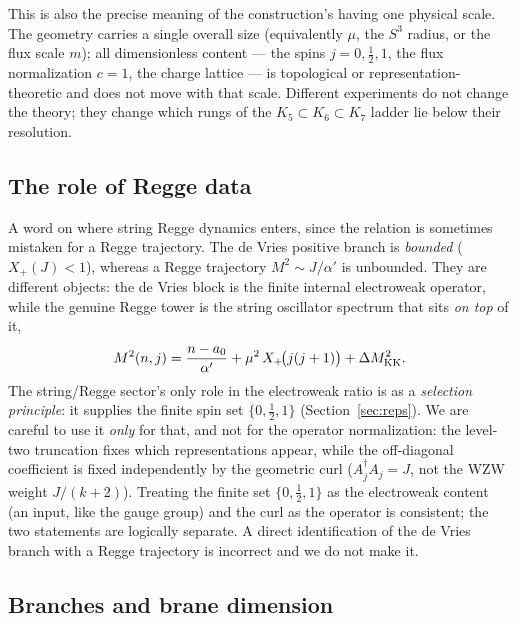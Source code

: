 \documentclass[11pt]{article}
\theoremstyle{plain}
\theoremstyle{definition}
\newcommand{\Xp}{X_{+}}
\newcommand{\half}{\tfrac12}
\begin{document}
This is also the precise meaning of the construction's having one physical
scale. The geometry carries a single overall size (equivalently $\mu$, the
$S^3$ radius, or the flux scale $m$); all dimensionless content --- the spins
$j=0,\half,1$, the flux normalization $c=1$, the charge lattice --- is
topological or representation-theoretic and does not move with that scale.
Different experiments do not change the theory; they change which rungs of
the $K_5\subset K_6\subset K_7$ ladder lie below their resolution.

\subsection{The role of Regge data}

A word on where string Regge dynamics enters, since the relation is sometimes
mistaken for a Regge trajectory. The de Vries positive branch is
\emph{bounded} ($\Xp(J)<1$), whereas a Regge trajectory $M^2\sim J/\alpha'$
is unbounded. They are different objects: the de Vries block is the finite
internal electroweak operator, while the genuine Regge tower is the string
oscillator spectrum that sits \emph{on top} of it,
\begin{equation}
M^2(n,j)=\frac{n-a_0}{\alpha'}+\mu^2\,\Xp\!\bigl(j(j+1)\bigr)
+\Delta M^2_{\rm KK}.
\end{equation}
The string/Regge sector's only role in the electroweak ratio is as a
\emph{selection principle}: it supplies the finite spin set $\{0,\half,1\}$
(Section~\ref{sec:reps}). We are careful to use it \emph{only} for that, and
not for the operator normalization: the level-two truncation fixes which
representations appear, while the off-diagonal coefficient is fixed
independently by the geometric curl ($A_j^\dagger A_j=J$, not the WZW weight
$J/(k+2)$). Treating the finite set $\{0,\half,1\}$ as the electroweak content
(an input, like the gauge group) and the curl as the operator is consistent;
the two statements are logically separate. A direct identification of the de
Vries branch with a Regge trajectory is incorrect and we do not make it.

\subsection{Branches and brane dimension}
\label{sec:branescaling}
\end{document}
